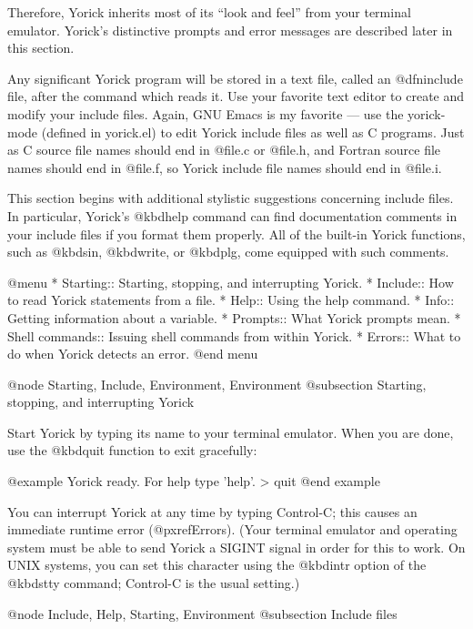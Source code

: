 {Therefore, Yorick inherits most of its ``look and feel'' from your
terminal emulator.  Yorick's distinctive prompts and error messages
are described later in this section.

Any significant Yorick program will be stored in a text file, called
an @dfn{include} file, after the command which reads it.  Use your
favorite text editor to create and modify your include files.  Again,
GNU Emacs is my favorite --- use the yorick-mode (defined in
yorick.el) to edit Yorick include files as well as C programs.  Just
as C source file names should end in @file{.c} or @file{.h}, and
Fortran source file names should end in @file{.f}, so Yorick include
file names should end in @file{.i}.

This section begins with additional stylistic suggestions concerning
include files.  In particular, Yorick's @kbd{help} command can find
documentation comments in your include files if you format them
properly.  All of the built-in Yorick functions, such as @kbd{sin},
@kbd{write}, or @kbd{plg}, come equipped with such comments.


@menu
* Starting::                    Starting, stopping, and interrupting Yorick.
* Include::                     How to read Yorick statements from a file.
* Help::                        Using the help command.
* Info::                        Getting information about a variable.
* Prompts::                     What Yorick prompts mean.
* Shell commands::              Issuing shell commands from within Yorick.
* Errors::                      What to do when Yorick detects an error.
@end menu

@node Starting, Include, Environment, Environment
@subsection Starting, stopping, and interrupting Yorick

Start Yorick by typing its name to your terminal emulator.  When you
are done, use the @kbd{quit} function to exit gracefully:

@example
 Yorick ready.  For help type 'help'.
> quit
%
@end example

You can interrupt Yorick at any time by typing Control-C; this causes
an immediate runtime error (@pxref{Errors}).  (Your terminal emulator
and operating system must be able to send Yorick a SIGINT signal in
order for this to work.  On UNIX systems, you can set this character
using the @kbd{intr} option of the @kbd{stty} command; Control-C is the
usual setting.)


@node Include, Help, Starting, Environment
@subsection Include files

}

